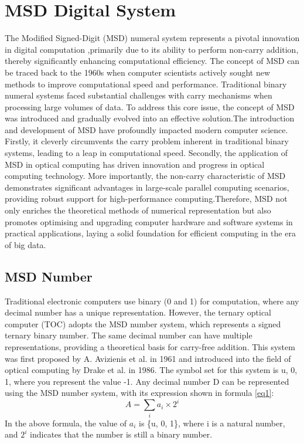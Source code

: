\documentclass[electronics,article,accept,pdftex,moreauthors]{Definitions/mdpi}
\begin{document}
\section{MSD Digital System}
The Modified Signed-Digit (MSD) numeral system represents a pivotal innovation in digital computation\cite{ref15,ref16,ref17,ref18}
,primarily due to its ability to perform non-carry addition, thereby significantly enhancing computational efficiency. The concept of MSD can be traced back to the 1960s when computer scientists actively sought new methods to improve computational speed and performance. Traditional binary numeral systems faced substantial challenges with carry mechanisms when processing large volumes of data. To address this core issue, the concept of MSD was introduced and gradually evolved into an effective solution.The introduction and development of MSD have profoundly impacted modern computer science. Firstly, it cleverly circumvents the carry problem inherent in traditional binary systems, leading to a leap in computational speed. Secondly, the application of MSD in optical computing has driven innovation and progress in optical computing technology. More importantly, the non-carry characteristic of MSD demonstrates significant advantages in large-scale parallel computing scenarios, providing robust support for high-performance computing.Therefore, MSD not only enriches the theoretical methods of numerical representation but also promotes optimising and upgrading computer hardware and software systems in practical applications, laying a solid foundation for efficient computing in the era of big data.
\subsection{MSD Number}
Traditional electronic computers use binary (0 and 1) for computation, where any decimal number has a unique representation. However, the ternary optical computer (TOC) adopts the MSD number system, which represents a signed ternary binary number. The same decimal number can have multiple representations, providing a theoretical basis for carry-free addition. This system was first proposed by A. Avizienis et al. in 1961 and introduced into the field of optical computing by Drake et al. in 1986. The symbol set for this system is {u, 0, 1}, where you represent the value -1. Any decimal number D can be represented using the MSD number system, with its expression shown in formula  \ref{eq1}:
\begin{equation}
A = \sum_{i} a_i \times 2^i
\label{eq1}
\end{equation}
In the above formula, the value of $a_i$ is \{u, 0, 1\}, where i is a natural number, and $2^i$ indicates that the number is still a binary number.
\end{document}
